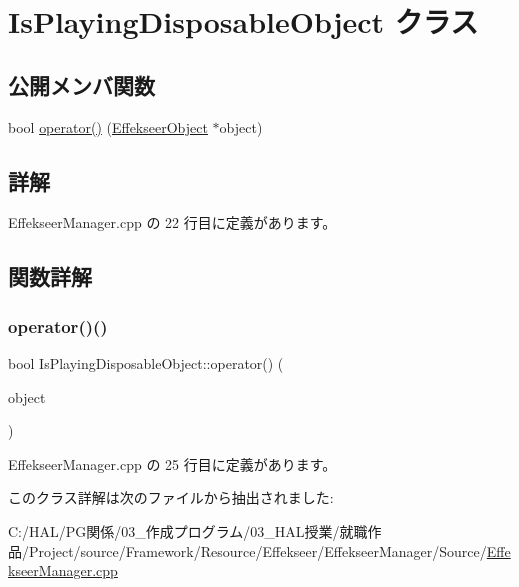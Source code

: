 \hypertarget{class_is_playing_disposable_object}{}\section{Is\+Playing\+Disposable\+Object クラス}
\label{class_is_playing_disposable_object}
\subsection*{公開メンバ関数}
\begin{DoxyCompactItemize}
\item 
bool \mbox{\hyperlink{class_is_playing_disposable_object_aae3835c78851e50028556ec5b475ac8d}{operator()}} (\mbox{\hyperlink{class_effekseer_object}{Effekseer\+Object}} $\ast$object)
\end{DoxyCompactItemize}


\subsection{詳解}


 Effekseer\+Manager.\+cpp の 22 行目に定義があります。



\subsection{関数詳解}
\mbox{\label{class_is_playing_disposable_object_aae3835c78851e50028556ec5b475ac8d}} 
\subsubsection{\texorpdfstring{operator()()}{operator()()}}
{\footnotesize\ttfamily bool Is\+Playing\+Disposable\+Object\+::operator() (\begin{DoxyParamCaption}\item[{\mbox{\hyperlink{class_effekseer_object}{Effekseer\+Object}} $\ast$}]{object }\end{DoxyParamCaption})\hspace{0.3cm}{\ttfamily [inline]}}



 Effekseer\+Manager.\+cpp の 25 行目に定義があります。



このクラス詳解は次のファイルから抽出されました\+:\begin{DoxyCompactItemize}
\item 
C\+:/\+H\+A\+L/\+P\+G関係/03\+\_\+作成プログラム/03\+\_\+\+H\+A\+L授業/就職作品/\+Project/source/\+Framework/\+Resource/\+Effekseer/\+Effekseer\+Manager/\+Source/\mbox{\hyperlink{_effekseer_manager_8cpp}{Effekseer\+Manager.\+cpp}}\end{DoxyCompactItemize}
